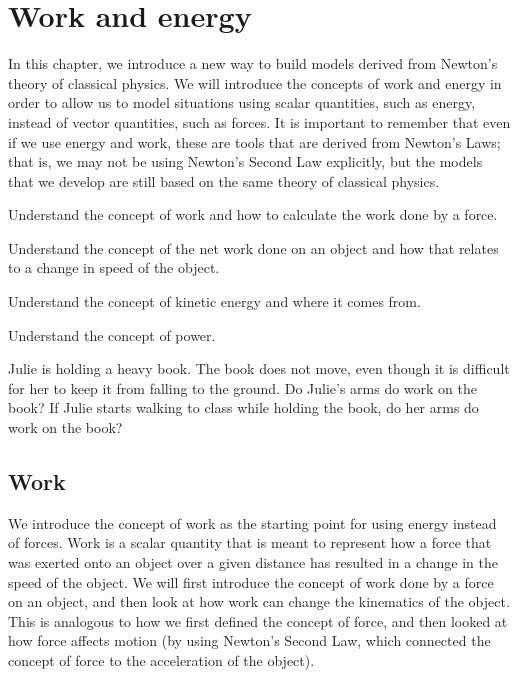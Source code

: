 \chapter{Work and energy}
\label{chap:workenergy}
In this chapter, we introduce a new way to build models derived from Newton's theory of classical physics. We will introduce the concepts of work and energy in order to allow us to model situations using scalar quantities, such as energy, instead of vector quantities, such as forces. It is important to remember that even if we use energy and work, these are tools that are derived from Newton's Laws; that is, we may not be using Newton's Second Law explicitly, but the models that we develop are still based on the same theory of classical physics. 

\begin{learningObjectives}{
 \item Understand the concept of work and how to calculate the work done by a force.
 \item Understand the concept of the net work done on an object and how that relates to a change in speed of the object.
 \item Understand the concept of kinetic energy and where it comes from.
 \item Understand the concept of power.
 }
\end{learningObjectives}

\begin{opening}
Julie is holding a heavy book. The book does not move, even though it is difficult for her to keep it from falling to the ground. Do Julie's arms do work on the book? If Julie starts walking to class while holding the book, do her arms do work on the book? 
\end{opening}

\newpage
\section{Work}
We introduce the concept of work as the starting point for using energy instead of forces. Work is a scalar quantity that is meant to represent how a force that was exerted onto an object over a given distance has resulted in a change in the speed of the object. We will first introduce the concept of work done by a force on an object, and then look at how work can change the kinematics of the object. This is analogous to how we first defined the concept of force, and then looked at how force affects motion (by using Newton's Second Law, which connected the concept of force to the acceleration of the object).

